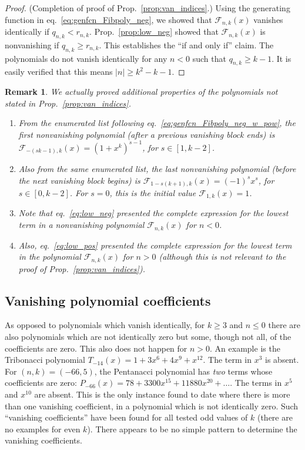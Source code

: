 \documentclass[review]{elsarticle}
\theoremstyle{plain}
\newtheorem{remark}[theorem]{Remark}
\begin{document}
\begin{proof}\label{proof:proof_van_indices}
(Completion of proof of Prop.~\ref{prop:van_indices}.)
Using the generating function in eq.~\eqref{eq:genfcn_Fibpoly_neg}, we showed that 
$\mathcal{F}_{n,k}(x)$ vanishes identically if $q_{n,k} < r_{n,k}$.
Prop.~\ref{prop:low_neg} showed that
$\mathcal{F}_{n,k}(x)$ is nonvanishing if $q_{n,k} \ge r_{n,k}$.
This establishes the ``if and only if'' claim.
The polynomials do not vanish identically for any $n<0$ such that $q_{n,k}\ge k-1$.
It is easily verified that this means $|n| \ge k^2-k-1$.
\end{proof}
\begin{remark}
We actually proved additional properties of the polynomials not stated in Prop.~\ref{prop:van_indices}.
\begin{enumerate}
\item
  From the enumerated list following eq.~\eqref{eq:genfcn_Fibpoly_neg_w_pow},
  the first nonvanishing polynomial (after a previous vanishing block ends) is $\mathcal{F}_{-(sk-1),k}(x)=(1+x^k)^{s-1}$, for $s\in[1,k-2]$.
\item
  Also from the same enumerated list,
  the last nonvanishing polynomial (before the next vanishing block begins) is $\mathcal{F}_{1-s(k+1),k}(x)=(-1)^s x^s$, for $s\in[0,k-2]$.
  For $s=0$, this is the initial value $\mathcal{F}_{1,k}(x)=1$.
\item
  Note that eq.~\eqref{eq:low_neg} presented the complete expression for the lowest term in a nonvanishing polynomial $\mathcal{F}_{n,k}(x)$ for $n<0$.  
\item
  Also, eq.~\eqref{eq:low_pos} presented the complete expression for the lowest term in the polynomial $\mathcal{F}_{n,k}(x)$ for $n>0$
  (although this is not relevant to the proof of Prop.~\ref{prop:van_indices}).
\end{enumerate}
\end{remark}

\subsection{Vanishing polynomial coefficients}
As opposed to polynomials which vanish identically,
for $k\ge3$ and $n\le0$ there are also polynomials which are not identically zero but some, though not all, of the coefficients are zero.
This also does not happen for $n>0$.
An example is the Tribonacci polynomial $T_{-14}(x) = 1 +3x^6 +4x^9 +x^{12}$.
The term in $x^3$ is absent.
For $(n,k)=(-66,5)$, the Pentanacci polynomial has \emph{two} terms whose coefficients are zero:
$P_{-66}(x) = 78 +3300x^{15} +11880x^{20} +\dots$.
The terms in $x^5$ and $x^{10}$ are absent.
This is the only instance found to date where there is more than one vanishing coefficient, in a polynomial which is not identically zero.  
Such ``vanishing coefficients'' have been found for all tested odd values of $k$ (there are no examples for even $k$).
There appears to be no simple pattern to determine the vanishing coefficients.
\end{document}
